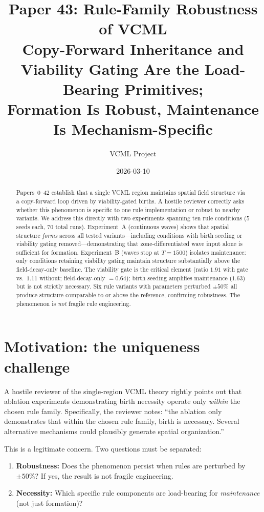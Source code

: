\documentclass[11pt,a4paper]{article}
\title{\textbf{Paper 43: Rule-Family Robustness of VCML}\\
\large Copy-Forward Inheritance and Viability Gating Are the Load-Bearing Primitives;\\
Formation Is Robust, Maintenance Is Mechanism-Specific}
\author{VCML Project}
\date{2026-03-10}
\begin{document}
\maketitle

\begin{abstract}
Papers~0--42 establish that a single VCML region maintains spatial field structure via a
copy-forward loop driven by viability-gated births.  A hostile reviewer correctly asks
whether this phenomenon is specific to one rule implementation or robust to nearby
variants.  We address this directly with two experiments spanning ten rule conditions
($5$ seeds each, $70$ total runs).  Experiment~A (continuous waves) shows that spatial
structure \emph{forms} across all tested variants---including conditions with birth seeding
or viability gating removed---demonstrating that zone-differentiated wave input alone is
sufficient for formation.  Experiment~B (waves stop at $T{=}1500$) isolates maintenance:
only conditions retaining viability gating maintain structure substantially above the
field-decay-only baseline.  The viability gate is the critical element (ratio $1.91$ with
gate vs.\ $1.11$ without; field-decay-only $= 0.64$); birth seeding amplifies maintenance
($1.63$) but is not strictly necessary.  Six rule variants with parameters perturbed
$\pm50\%$ all produce structure comparable to or above the reference, confirming robustness.
The phenomenon is \emph{not} fragile rule engineering.
\end{abstract}

\section{Motivation: the uniqueness challenge}

A hostile reviewer of the single-region VCML theory rightly points out that ablation
experiments demonstrating birth necessity operate only \emph{within} the chosen rule
family.  Specifically, the reviewer notes: ``the ablation only demonstrates that within
the chosen rule family, birth is necessary.  Several alternative mechanisms could
plausibly generate spatial organization.''

This is a legitimate concern.  Two questions must be separated:

\begin{enumerate}
\item \textbf{Robustness:} Does the phenomenon persist when rules are perturbed by
  $\pm50\%$?  If yes, the result is not fragile engineering.
\item \textbf{Necessity:} Which specific rule components are load-bearing for
  \emph{maintenance} (not just formation)?
\end{enumerate}
\end{document}
